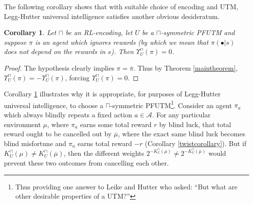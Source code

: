 \documentclass{article}
\newtheorem{corollary}[theorem]{Corollary}
\def\LH{\Upsilon}
\begin{document}
The following corollary shows that with suitable choice of encoding and UTM,
Legg-Hutter universal intelligence satisfies another obvious desideratum.

\begin{corollary}
\label{ignoringrewardscorollary}
    Let $\sqcap$ be an RL-encoding,
    let $U$ be a $\sqcap$-symmetric PFUTM and
    suppose $\pi$ is an agent which ignores rewards (by which we mean that
    $\pi(\bullet|s)$ does not depend on the rewards in $s$).
    Then $\LH^\sqcap_U(\pi)=0$.
\end{corollary}

\begin{proof}
    The hypothesis clearly implies $\pi=\overline\pi$. Thus by Theorem
    \ref{maintheorem}, $\LH^\sqcap_U(\pi)=-\LH^\sqcap_U(\pi)$,
    forcing $\LH^\sqcap_U(\pi)=0$.
\end{proof}

Corollary \ref{ignoringrewardscorollary} illustrates why it is appropriate, for
purposes of Legg-Hutter universal intelligence, to choose a $\sqcap$-symmetric
PFUTM\footnote{Thus providing one answer to Leike and Hutter
\cite{leike2015bad} who asked: ``But what are other desirable properties of a UTM?''}.
Consider an agent $\pi_a$
which always blindly repeats a fixed action $a\in\mathcal A$.
For any particular environment $\mu$,
where $\pi_a$ earns some total reward $r$ by blind luck,
that total reward ought to be cancelled out by $\overline\mu$, where
the exact same blind luck becomes blind misfortune and $\pi_a$ earns total reward
$-r$ (Corollary \ref{twistcorollary}). But if $K^\sqcap_U(\mu)\not=K^\sqcap_U(\overline\mu)$,
then the different weights
$2^{-K^\sqcap_U(\mu)}\not=2^{-K^\sqcap_U(\overline\mu)}$ would prevent
these two outcomes from cancelling each other.
\end{document}
